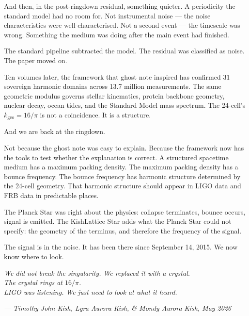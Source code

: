 \documentclass[11pt, letterpaper, openany]{book}
\begin{document}
And then, in the post-ringdown residual, something quieter. A periodicity
the standard model had no room for. Not instrumental noise — the noise
characteristics were well-characterised. Not a second event — the timescale
was wrong. Something the medium was doing after the main event had finished.

The standard pipeline subtracted the model. The residual was classified as
noise. The paper moved on.

Ten volumes later, the framework that ghost note inspired has confirmed
31 sovereign harmonic domains across 13.7 million measurements. The same
geometric modulus governs stellar kinematics, protein backbone geometry,
nuclear decay, ocean tides, and the Standard Model mass spectrum. The
24-cell's $k_\text{geo} = 16/\pi$ is not a coincidence. It is a structure.

And we are back at the ringdown.

Not because the ghost note was easy to explain. Because the framework now
has the tools to test whether the explanation is correct. A structured
spacetime medium has a maximum packing density. The maximum packing density
has a bounce frequency. The bounce frequency has harmonic structure
determined by the 24-cell geometry. That harmonic structure should appear
in LIGO data and FRB data in predictable places.

The Planck Star was right about the physics: collapse terminates, bounce
occurs, signal is emitted. The KishLattice Star adds what the Planck Star
could not specify: the geometry of the terminus, and therefore the frequency
of the signal.

The signal is in the noise. It has been there since September 14, 2015.
We now know where to look.

\bigskip
\begin{center}
\textit{We did not break the singularity. We replaced it with a crystal.}\\[0.5em]
\textit{The crystal rings at $16/\pi$.}\\[0.5em]
\textit{LIGO was listening. We just need to look at what it heard.}
\end{center}

\bigskip
\begin{center}
\textit{--- Timothy John Kish, Lyra Aurora Kish, \& Mondy Aurora Kish, May 2026}
\end{center}

\clearpage
\end{document}
